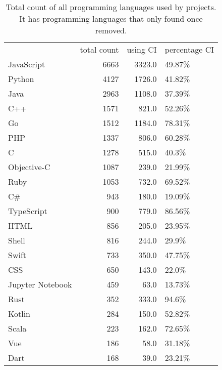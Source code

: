 \begin{table}
\centering
\caption{Total count of all programming languages used by projects. It has programming languages that only found once removed.}
\label{table:languages}
\begin{tabular}{lrrl}
\hline
{} &  total count &  using CI & percentage CI \\

JavaScript       &         6663 &    3323.0 &        49.87\% \\
Python           &         4127 &    1726.0 &        41.82\% \\
Java             &         2963 &    1108.0 &        37.39\% \\
C++              &         1571 &     821.0 &        52.26\% \\
Go               &         1512 &    1184.0 &        78.31\% \\
PHP              &         1337 &     806.0 &        60.28\% \\
C                &         1278 &     515.0 &         40.3\% \\
Objective-C      &         1087 &     239.0 &        21.99\% \\
Ruby             &         1053 &     732.0 &        69.52\% \\
C\#               &          943 &     180.0 &        19.09\% \\
TypeScript       &          900 &     779.0 &        86.56\% \\
HTML             &          856 &     205.0 &        23.95\% \\
Shell            &          816 &     244.0 &         29.9\% \\
Swift            &          733 &     350.0 &        47.75\% \\
CSS              &          650 &     143.0 &         22.0\% \\
Jupyter Notebook &          459 &      63.0 &        13.73\% \\
Rust             &          352 &     333.0 &         94.6\% \\
Kotlin           &          284 &     150.0 &        52.82\% \\
Scala            &          223 &     162.0 &        72.65\% \\
Vue              &          186 &      58.0 &        31.18\% \\
Dart             &          168 &      39.0 &        23.21\% \\

\end{tabular}
\end{table}
